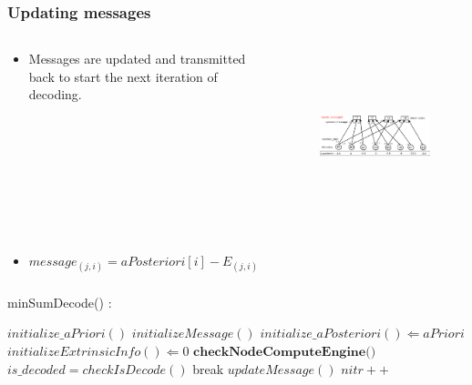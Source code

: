 \documentclass[xcolor=dvipsname]
{beamer}
\begin{document}
\begin{frame}[t]
\frametitle{ Updating messages }  
\vspace{-5mm}
\begin{columns}[totalwidth=\textwidth]
	\begin{column}{0.3\textwidth}
	\centering
	\begin{itemize}
	\item Messages are updated and transmitted back to start the next iteration of decoding.
	\end{itemize}
 
			
	\end{column}%
	   		
	\begin{column}{0.7\textwidth}
	\centering
	\begin{figure}
	\includegraphics[height=5cm,width=8cm]{minSum7}
	\end{figure}
	\end{column}%
\end{columns}

\begin{itemize}

\item \alert{$   message_{(j,i)} = aPosteriori[i] - E_{(j,i)}  $}
\end{itemize}
\end{frame}





\begin{frame}[t]
\frametitle{  }                                 %
\alert{ minSumDecode()	: }
\begin{algorithmic}                   
    \STATE $initialize\_aPriori() $
    \STATE $initializeMessage() $
    	\STATE$ initialize\_aPosteriori() \Leftarrow aPriori $
   		\STATE $initializeExtrinsicInfo() \Leftarrow 0 $
  		\STATE$\textbf{checkNodeComputeEngine()}$
    	\STATE $is\_decoded = checkIsDecode()$
        	\STATE break 
    	\ELSE
        	\STATE $updateMessage()$
     	\ENDIF 
     $nitr++$       	
    \ENDWHILE 
\end{algorithmic}
\end{frame}
\end{document}
